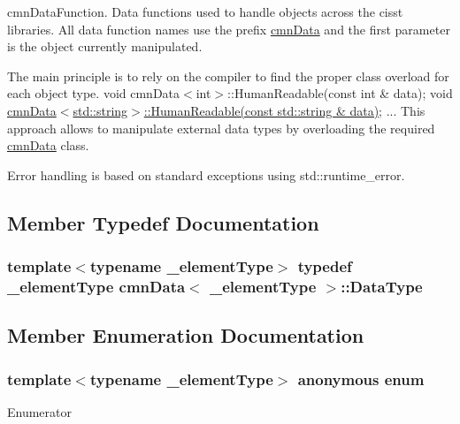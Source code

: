 cmn\-Data\-Function. Data functions used to handle objects across the cisst libraries. All data function names use the prefix \hyperlink{classcmn_data}{cmn\-Data} and the first parameter is the object currently manipulated.

The main principle is to rely on the compiler to find the proper class overload for each object type. {\ttfamily  void cmn\-Data$<$int$>$\-::\-Human\-Readable(const int \& data); void \hyperlink{classcmn_data_3_01std_1_1string_01_4_ab72e4cd237cd5e96082f78de567e7f3d}{cmn\-Data$<$std\-::string$>$\-::\-Human\-Readable(const std\-::string \& data)}; ... } This approach allows to manipulate external data types by overloading the required \hyperlink{classcmn_data}{cmn\-Data} class.

Error handling is based on standard exceptions using std\-::runtime\-\_\-error. 

\subsection{Member Typedef Documentation}
\hypertarget{classcmn_data_a353bd6bb0af651b6301e5e2e34587da2}{
\subsubsection[{Data\-Type}]{\setlength{\rightskip}{0pt plus 5cm}template$<$typename \-\_\-element\-Type$>$ typedef \-\_\-element\-Type {\bf cmn\-Data}$<$ \-\_\-element\-Type $>$\-::{\bf Data\-Type}}}\label{classcmn_data_a353bd6bb0af651b6301e5e2e34587da2}


\subsection{Member Enumeration Documentation}
\hypertarget{classcmn_data_a8e15f7bac4709a448e12083e816d59dd}{\subsubsection[{anonymous enum}]{\setlength{\rightskip}{0pt plus 5cm}template$<$typename \-\_\-element\-Type$>$ anonymous enum}}\label{classcmn_data_a8e15f7bac4709a448e12083e816d59dd}
\begin{Desc}
\item[Enumerator]\par
\begin{description}
\item[{\em 
\hypertarget{classcmn_data_a8e15f7bac4709a448e12083e816d59dda72e7c5ce850db7c34c87a0e5f4456c30}{I\-S\-\_\-\-S\-P\-E\-C\-I\-A\-L\-I\-Z\-E\-D}\label{classcmn_data_a8e15f7bac4709a448e12083e816d59dda72e7c5ce850db7c34c87a0e5f4456c30}
}]\end{description}
\end{Desc}


